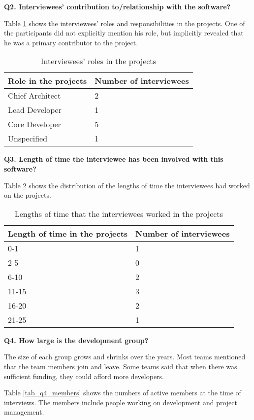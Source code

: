 \noindent\textbf{Q2. Interviewees’ contribution to/relationship with the software?}

Table \ref{tab_q2_roles} shows the interviewees’ roles and responsibilities in the projects. One of the participants did not explicitly mention his role, but implicitly revealed that he was a primary contributor to the project.

\begin{table}[H]
\centering
\begin{tabular}{ll}
\hline
Role in the projects & Number of interviewees \\ \hline
Chief Architect & 2 \\
Lead Developer & 1 \\
Core Developer & 5 \\
Unspecified & 1 \\ \hline
\end{tabular}
\caption{\label{tab_q2_roles}Interviewees' roles in the projects}
\end{table}

\noindent\textbf{Q3. Length of time the interviewee has been involved with this software?}

Table \ref{tab_q3_years} shows the distribution of the lengths of time the interviewees had worked on the projects.

\begin{table}[H]
\centering
\begin{tabular}{ll}
\hline
Length of time in the projects & Number of interviewees \\ \hline
0-1 & 1 \\
2-5 & 0 \\
6-10 & 2 \\
11-15 & 3 \\
16-20 & 2 \\
21-25 & 1 \\ \hline
\end{tabular}
\caption{\label{tab_q3_years}Lengths of time that the interviewees worked in the projects}
\end{table}

\noindent\textbf{Q4. How large is the development group?}

The size of each group grows and shrinks over the years. Most teams mentioned that the team members join and leave. Some teams said that when there was sufficient funding, they could afford more developers.

Table \ref{tab_q4_members} shows the numbers of active members at the time of interviews. The members include people working on development and project management.

